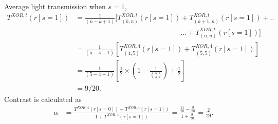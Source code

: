 Average light transmission when $s=1$,
\begin{align*}
T^{XOR,t}(r[s=1]) &= \frac{1}{(n-k+1)} [T^{XOR,t}_{(k,n)} (r[s=1]) + T^{XOR,t}_{(k+1,n)} (r[s=1]) + ..\\&\phantom{{}=\frac{1}{(n-k+1)} [T^{XOR,t}_{(k,n)} (r[s=1])}... + T^{XOR,t}_{(n,n)} (r[s=1])]\\
&=\frac{1}{(5-4+1)} [T^{XOR,4}_{(4,5)} (r[s=1]) +  T^{XOR,4}_{(5,5)} (r[s=1])]\\
&=\frac{1}{(5-4+1)} [ \frac {1}{2} \times (1 - \frac {1}{\binom 54})+\frac {1}{2} ]\\
&= 9/20.
\end{align*}
Contrast is calculated as  
\begin{align*}
\alpha &= \frac{T^{XOR,4}(r[s=0]) - T^{XOR,4}(r[s=1])}{1 +T^{XOR,4}(r[s=1])} =\frac{\frac{11}{20}-\frac{9}{20}}{1+\frac{9}{20}} = \frac{2}{29}. 
\end{align*}